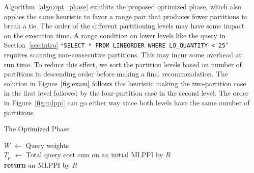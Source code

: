 \documentclass[runningheads]{comsis2}
\begin{document}
Algorithm~\ref{algo:opt_phase} exhibits the proposed optimized phase, 
which also applies the same heuristic to favor a range pair 
that produces fewer partitions to break a tie.  
The order of the different partitioning levels may have some impact on 
the execution time. A range condition on lower levels like the query 
in Section~\ref{sec:intro} 
``{\tt SELECT * FROM LINEORDER WHERE LO\_QUANTITY < 25}'' 
requires scanning non-consecutive partitions. 
This may \hbox{incur} some overhead at run time. 
To reduce this \hbox{effect}, we sort the partition \hbox{levels} based on number of 
partitions in descending order \hbox{before} making a final \hbox{recommendation}. 
The solution in \hbox{Figure}~\ref{fig:exam} follows this heuristic 
making the two-partition case in the first level 
followed by the four-partition case in the second level. 
The order in Figure~\ref{fig:mlppi} can go \hbox{either} way 
since both levels have the same number of \hbox{partitions}.

\begin{algorithm}[t]
\caption{The Optimized Phase}
\label{algo:opt_phase}
{
	$W$ $\leftarrow$ Query weights \\
	$T_{p}$ $\leftarrow$ Total query cost sum on an initial MLPPI by $R$ \\
	{\bf return} an MLPPI by $R$ \;
}
\end{algorithm}
\end{document}
